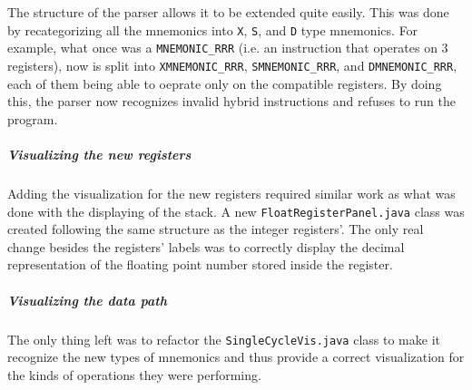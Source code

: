 The structure of the parser allows it to be extended quite easily. This was done by recategorizing all the mnemonics into \verb|X|, \verb|S|, and \verb|D| type mnemonics. For example, what once was a \verb|MNEMONIC_RRR| (i.e. an instruction that operates on 3 registers), now is split into \verb|XMNEMONIC_RRR|,  \verb|SMNEMONIC_RRR|, and  \verb|DMNEMONIC_RRR|, each of them being able to oeprate only on the compatible registers. By doing this, the parser now recognizes invalid hybrid instructions and refuses to run the program.

\subparagraph*{Visualizing the new registers}

Adding the visualization for the new registers required similar work as what was done with the displaying of the stack. A new \verb|FloatRegisterPanel.java| class was created following the same structure as the integer registers'. The only real change besides the registers' labels was to correctly display the decimal representation of the floating point number stored inside the register.

\subparagraph*{Visualizing the data path}

The only thing left was to refactor the \verb|SingleCycleVis.java| class to make it recognize the new types of mnemonics and thus provide a correct visualization for the kinds of operations they were performing.